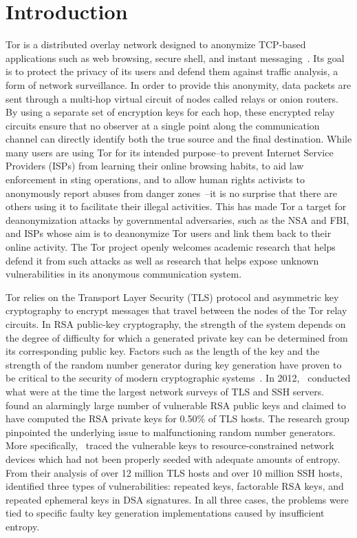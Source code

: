 \section{Introduction}
\label{sec:intro}
Tor is a distributed overlay network designed to anonymize TCP-based applications such as web browsing, secure shell, and instant messaging~\cite{dingledine2004tor}. Its goal is to protect the privacy of its users and defend them against traffic analysis, a form of network surveillance. In order to provide this anonymity, data packets are sent through a multi-hop virtual circuit of nodes called relays or onion routers. By using a separate set of encryption keys for each hop, these encrypted relay circuits ensure that no observer at a single point along the communication channel can directly identify both the true source and the final destination. While many users are using Tor for its intended purpose--to prevent Internet Service Providers (ISPs) from learning their online browsing habits, to aid law enforcement in sting operations, and to allow human rights activists to anonymously report abuses from danger zones~\cite{torusers}--it is no surprise that there are others using it to facilitate their illegal activities. This has made Tor a target for deanonymization attacks by governmental adversaries, such as the NSA and FBI, and ISPs whose aim is to deanonymize Tor users and link them back to their online activity. The Tor project openly welcomes academic research that helps defend it from such attacks as well as research that helps expose unknown vulnerabilities in its anonymous communication system.

Tor relies on the Transport Layer Security (TLS) protocol and asymmetric key cryptography to encrypt messages that travel between the nodes of the Tor relay circuits. In RSA public-key cryptography, the strength of the system depends on the degree of difficulty for which a generated private key can be determined from its corresponding public key. Factors such as the length of the key and the strength of the random number generator during key generation have proven to be critical to the security of modern cryptographic systems~\cite{rivest1978method, heninger2012mining, lenstra2012ron}. In 2012,~\cite{heninger2012mining, lenstra2012ron} conducted what were at the time the largest network surveys of TLS and SSH servers.~\cite{heninger2012mining} found an alarmingly large number of vulnerable RSA public keys and claimed to have computed the RSA private keys for 0.50\% of TLS hosts. The research group pinpointed the underlying issue to malfunctioning random number generators. More specifically,~\cite{heninger2012mining} traced the vulnerable keys to resource-constrained network devices which had not been properly seeded with adequate amounts of entropy. From their analysis of over 12 million TLS hosts and over 10 million SSH hosts,~\cite{heninger2012mining} identified three types of vulnerabilities: repeated keys, factorable RSA keys, and repeated ephemeral keys in DSA signatures. In all three cases, the problems were tied to specific faulty key generation implementations caused by insufficient entropy.

